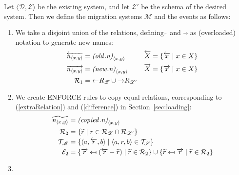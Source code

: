 \documentclass[runningheads]{llncs}
\newcommand{\id}[1]{\text{\it #1\/}}
\newcommand{\declare}[3]{\id{#1}_{\pair{#2}{#3}}}
\newcommand{\pair}[2]{\langle{#1},{#2}\rangle}
\newcommand{\triple}[3]{\langle{#1},{#2},{#3}\rangle}
\newcommand{\rels}{\mathcal{R}}   %
\newcommand{\triples}{\mathcal{T}}
\newcommand{\dataset}{\mathscr{D}}
\newcommand{\schema}{\mathscr{Z}}
\newcommand{\migrsys}{\mathscr{M}}
\newcommand{\infsys}{\mathscr{S}}
\begin{document}
   Let $\pair{\dataset}{\schema}$ be the existing system, and let ${\schema'}$ be the schema of the desired system.
   Then we define the migration systems $\migrsys$ and the events as follows:
   \begin{enumerate}
   \item We take a disjoint union of the relations, defining $\overleftarrow~$ and $\overrightarrow~$ as (overloaded) notation to generate new names:
   \begin{align}
   \overleftarrow{\declare{n}{x}{y}}&=\declare{(\id{old}.n)}{x}{y}&\overleftarrow{X} &= \{\overleftarrow{x}\mid x\in X\}\\
   \overrightarrow{\declare{n}{x}{y}}&=\declare{(\id{new}.n)}{x}{y}& \overrightarrow{X} &= \{\overrightarrow{x}\mid x\in X\}\\
   \rels_1 &= \overleftarrow\rels_{\schema} \cup \overrightarrow\rels_{\schema'}
   \end{align}
   \item We create ENFORCE rules to copy equal relations, corresponding to (\ref{extraRelation}) and (\ref{difference}) in Section~\ref{sec:loading}:
   \begin{align}
   \widetilde{\declare{n}{x}{y}} &= \declare{(\id{copied}.n)}{x}{y}\\
   \rels_2 &= \{\widetilde{r}\mid r \in \rels_\schema \cap \rels_{\schema'}\}\\
   \triples_\migrsys &= \{\triple{a}{\overleftarrow{r}}{b} \mid \triple{a}{r}{b}\in\triples_\infsys\}\\
   \mathcal{E}_2 &= \{\overrightarrow{r}\mapsfrom (\overleftarrow{r} - \widetilde{r}) \mid \widetilde{r} \in \rels_2\} \cup \{\widetilde{r}\mapsfrom \overrightarrow{r} \mid \widetilde{r} \in \rels_2\}
   \end{align}
   \item 
   \end{enumerate}
   
\end{document}
